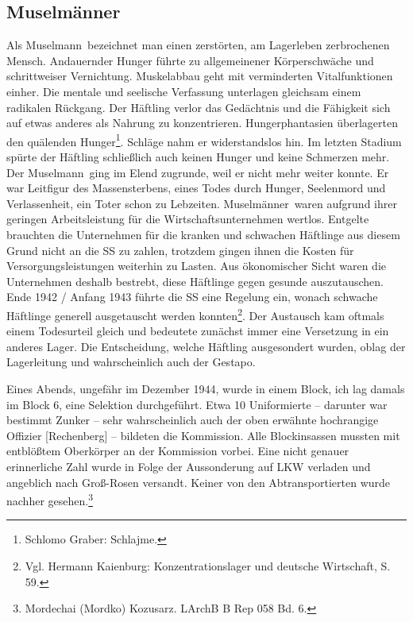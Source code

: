\subsection{\glqq Muselmänner\grqq}
Als \glqq Muselmann\grqq~bezeichnet man einen zerstörten, am Lagerleben zerbrochenen Mensch. Andauernder Hunger führte zu allgemeinener Körperschwäche und schrittweiser Vernichtung. Muskelabbau geht mit verminderten Vitalfunktionen einher. Die mentale und seelische Verfassung unterlagen gleichsam einem radikalen Rückgang. Der Häftling verlor das Gedächtnis und die Fähigkeit sich auf etwas anderes als Nahrung zu konzentrieren. Hungerphantasien überlagerten den quälenden Hunger\footnote{Schlomo Graber: \glqq Schlajme\grqq.}. Schläge nahm er widerstandslos hin. Im letzten Stadium spürte der Häftling schließlich auch keinen Hunger und keine Schmerzen mehr. Der \glqq Muselmann\grqq~ging im Elend zugrunde, weil er nicht mehr weiter konnte. Er war Leitfigur des Massensterbens, eines Todes durch Hunger, Seelenmord und Verlassenheit, ein Toter schon zu Lebzeiten.
\newline
\glqq Muselmänner\grqq~waren aufgrund ihrer geringen Arbeitsleistung für die Wirtschaftsunternehmen wertlos. Entgelte brauchten die Unternehmen für die kranken und schwachen Häftlinge aus diesem Grund nicht an die SS zu zahlen, trotzdem gingen ihnen die Kosten für Versorgungsleistungen weiterhin zu Lasten. Aus ökonomischer Sicht waren die Unternehmen deshalb bestrebt, diese Häftlinge gegen gesunde auszutauschen. Ende 1942 / Anfang 1943 führte die SS eine Regelung ein, wonach schwache Häftlinge generell ausgetauscht werden konnten\footnote{Vgl. Hermann Kaienburg: Konzentrationslager und deutsche Wirtschaft, S. 59.}. Der Austausch kam oftmals einem Todesurteil gleich und bedeutete zunächst immer eine Versetzung in ein anderes Lager. Die Entscheidung, welche Häftling ausgesondert wurden, oblag der Lagerleitung und wahrscheinlich auch der Gestapo.
\begin{leftbar}
Eines Abends, ungefähr im Dezember 1944, wurde in einem Block, ich lag damals im Block 6, eine Selektion durchgeführt. Etwa 10 Uniformierte -- darunter war bestimmt Zunker -- sehr wahrscheinlich auch der oben erwähnte hochrangige Offizier [Rechenberg] -- bildeten die Kommission. Alle Blockinsassen mussten mit entblößtem Oberkörper an der Kommission vorbei. Eine nicht genauer erinnerliche Zahl wurde in Folge der Aussonderung auf LKW verladen und angeblich nach Groß-Rosen versandt. Keiner von den Abtransportierten wurde nachher gesehen.\footnote{Mordechai (Mordko) Kozusarz. LArchB B Rep 058 Bd. 6.}
\end{leftbar}

